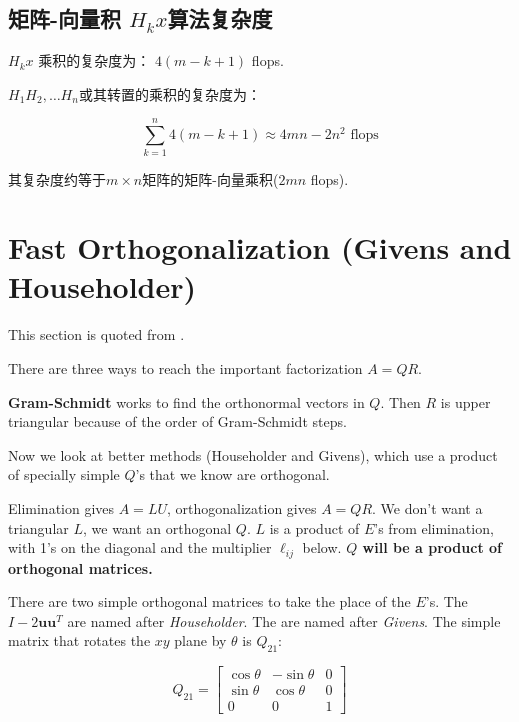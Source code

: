 \subsection{矩阵-向量积 $ H_{k} x $算法复杂度}
\label{complexity:Hkx}

$ H_{k} x $ 乘积的复杂度为： $ 4( {m}- {k}+1) $ flops.

$H_{1} H_{2}, \ldots H_{n} $或其转置的乘积的复杂度为： 

\begin{equation} \sum_{k=1}^{n} 4(m-k+1) \approx 4 m n-2 n^{2}  \text{ flops}\end{equation}

其复杂度约等于$m \times n$矩阵的矩阵-向量乘积($2mn$ flops). 


\section{Fast Orthogonalization (Givens and Householder)}

\begin{remark}
    This section is quoted from \cite{Strang1993IntroductionTL}.
\end{remark}

There are three ways to reach the important factorization $A=Q R$. 

\textbf{Gram-Schmidt} works to find the orthonormal vectors in $Q .$ Then $R$ is upper triangular because of the order of Gram-Schmidt steps. 

Now we look at better methods (Householder and Givens), which use a product of specially simple $Q$'s that we know are orthogonal.

Elimination gives $A=L U$, orthogonalization gives $A=Q R$. We don't want a triangular $L$, we want an orthogonal $Q$. $L$ is a product of $E$'s from elimination, with 1's on the diagonal and the multiplier $\ell_{i j}$ below. \textbf{$Q$ will be a product of orthogonal matrices.}

There are two simple orthogonal matrices to take the place of the $E$'s. The  $I-2 \boldsymbol{u} \boldsymbol{u}^{ {T}}$ are named after \textit{Householder}. The  are named after \textit{Givens}. The simple matrix that rotates the $x y$ plane by $\theta$ is $Q_{21}$:  

\begin{definition}
    \begin{equation}Q_{21}=\left[\begin{array}{crc}
        \cos \theta & -\sin \theta & 0 \\
        \sin \theta & \cos \theta & 0 \\
        0 & 0 & 1
        \end{array}\right]\end{equation}
\end{definition}


